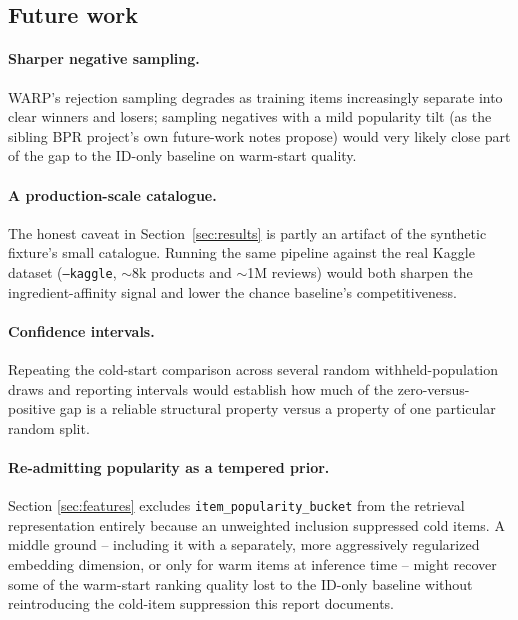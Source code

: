 \subsection{Future work}

\paragraph{Sharper negative sampling.} WARP's rejection sampling degrades as
training items increasingly separate into clear winners and losers; sampling
negatives with a mild popularity tilt (as the sibling BPR project's own
future-work notes propose) would very likely close part of the gap to the
ID-only baseline on warm-start quality.

\paragraph{A production-scale catalogue.} The honest caveat in
Section~\ref{sec:results} is partly an artifact of the synthetic fixture's
small catalogue. Running the same pipeline against the real Kaggle dataset
(\texttt{--kaggle}, $\sim$8k products and $\sim$1M reviews) would both sharpen
the ingredient-affinity signal and lower the chance baseline's competitiveness.

\paragraph{Confidence intervals.} Repeating the cold-start comparison across
several random withheld-population draws and reporting intervals would
establish how much of the zero-versus-positive gap is a reliable structural
property versus a property of one particular random split.

\paragraph{Re-admitting popularity as a tempered prior.} Section
\ref{sec:features} excludes \texttt{item\_popularity\_bucket} from the
retrieval representation entirely because an unweighted inclusion suppressed
cold items. A middle ground -- including it with a separately, more
aggressively regularized embedding dimension, or only for warm items at
inference time -- might recover some of the warm-start ranking quality lost
to the ID-only baseline without reintroducing the cold-item suppression
this report documents.
